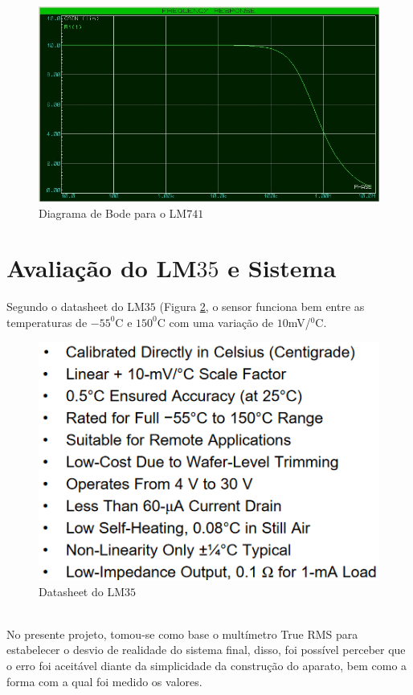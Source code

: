 \documentclass[14pt, oneside]{book}
\newcommand\tab[1][1cm]{\hspace*{#1}}
\theoremstyle{definition}
\begin{document}
                
                \begin{figure}[H]
                    \centering
                    \includegraphics[scale= 0.5]{bode.jpg}
                    \caption{Diagrama de Bode para o LM$741$}
                    \label{fig:my_label}
                \end{figure}
            \section{Avaliação do LM$35$ e Sistema}
                \tab Segundo o datasheet do LM$35$ (Figura \ref{datasheet}, o sensor funciona bem entre as temperaturas de $-55^0$C e $150^0$C com uma variação de $10$mV/$^0$C.
                
                \begin{figure}[H]
                    \centering
                    \includegraphics[scale = 0.8]{datasheet.png}
                    \caption{Datasheet do LM$35$}
                    \label{datasheet}
                \end{figure} \\
                \tab No presente projeto, tomou-se como base o multímetro True RMS para estabelecer o desvio de realidade do sistema final, disso, foi possível perceber que o erro foi aceitável diante da simplicidade da construção do aparato, bem como a forma com a qual foi medido os valores.
                
\end{document}
